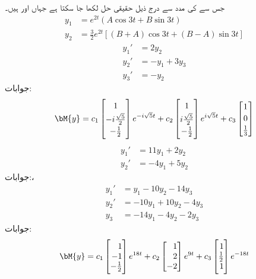 جس سے  کی مدد سے درج ذیل حقیقی حل لکھا جا سکتا ہے جہاں  اور  ہیں۔
\begin{align*}
y_1&=e^{2t}(A\cos 3t+B\sin 3t)\\
y_2&=\tfrac{3}{2}e^{2t}[(B+A)\cos 3t+(B-A)\sin 3t]
\end{align*}
\begin{align*}
y_1'&=2y_2\\
y_2'&=-y_1+3y_3\\
y_3'&=-y_2
\end{align*}
جوابات:
\begin{align*}
\bM{y}=c_1\begin{bmatrix}1\\[0.5ex] -i\tfrac{\sqrt{5}}{2} \\[0.5ex] -\tfrac{1}{2} \end{bmatrix}e^{-i\sqrt{5}t}+c_2\begin{bmatrix} 1\\[0.5ex]  i\tfrac{\sqrt{5}}{2}\\[0.5ex] -\tfrac{1}{2} \end{bmatrix} e^{i\sqrt{5}t}+c_3\begin{bmatrix}1\\[0.5ex] 0 \\[0.5ex]  \tfrac{1}{3}  \end{bmatrix}
\end{align*}
\begin{align*}
y_1'&=11y_1+2y_2\\
y_2'&=-4y_1+5y_2
\end{align*}
جوابات:، 
\begin{align*}
y_1'&=y_1-10y_2-14y_3\\
y_2'&=-10y_1+10y_2-4y_3\\
y_3&=-14y_1-4y_2-2y_3
\end{align*}
جوابات:
\begin{align*}
\bM{y}=c_1\begin{bmatrix*}[r] 1 \\ -1 \\ -\tfrac{1}{2} \end{bmatrix*}e^{18t}+c_2\begin{bmatrix*}[r] 1\\2\\-2 \end{bmatrix*} e^{9t}+c_3\begin{bmatrix*}[r] 1\\ \tfrac{1}{2}\\1 \end{bmatrix*} e^{-18t}
\end{align*}

